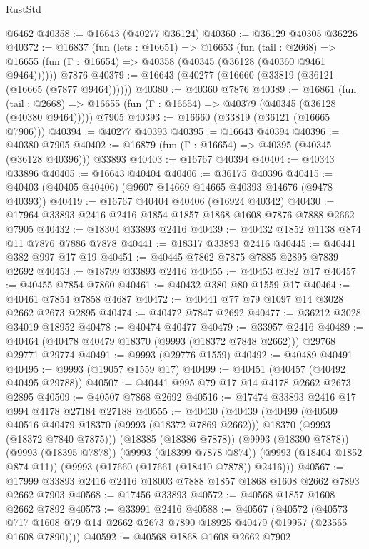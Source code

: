 \begin{lexlean}{RustStd}
\begin{coremodule}
    @6462
@40358 := @16643 (@40277 @36124)
@40360 := @36129 @40305 @36226
@40372 := @16837
    (fun (lets : @16651) =>
    @16653
      (fun (tail : @2668) =>
      @16655 (fun (Γ : @16654) => @40358 (@40345 (@36128 (@40360 @9461 @9464))))))
    @7876
@40379 := @16643 (@40277 (@16660 (@33819 (@36121 (@16665 (@7877 @9464))))))
@40380 := @40360 @7876
@40389 := @16861
    (fun (tail : @2668) => @16655 (fun (Γ : @16654) => @40379 (@40345 (@36128 (@40380 @9464)))))
    @7905
@40393 := @16660 (@33819 (@36121 (@16665 @7906)))
@40394 := @40277 @40393
@40395 := @16643 @40394
@40396 := @40380 @7905
@40402 := @16879 (fun (Γ : @16654) => @40395 (@40345 (@36128 @40396))) @33893
@40403 := @16767 @40394
@40404 := @40343 @33896
@40405 := @16643 @40404
@40406 := @36175 @40396
@40415 := @40403 (@40405 @40406) (@9607 @14669 @14665 @40393 @14676 (@9478 @40393))
@40419 := @16767 @40404 @40406 (@16924 @40342)
@40430 := @17964 @33893 @2416 @2416 @1854 @1857 @1868 @1608 @7876 @7888 @2662 @7905
@40432 := @18304 @33893 @2416
@40439 := @40432 @1852 @1138 @874 @11 @7876 @7886 @7878
@40441 := @18317 @33893 @2416
@40445 := @40441 @382 @997 @17 @19
@40451 := @40445 @7862 @7875 @7885 @2895 @7839 @2692
@40453 := @18799 @33893 @2416
@40455 := @40453 @382 @17
@40457 := @40455 @7854 @7860
@40461 := @40432 @380 @80 @1559 @17
@40464 := @40461 @7854 @7858 @4687
@40472 := @40441 @77 @79 @1097 @14 @3028 @2662 @2673 @2895
@40474 := @40472 @7847 @2692
@40477 := @36212 @3028 @34019 @18952
@40478 := @40474 @40477
@40479 := @33957 @2416
@40489 := @40464 (@40478 @40479 @18370 (@9993 (@18372 @7848 @2662))) @29768 @29771 @29774
@40491 := @9993 (@29776 @1559)
@40492 := @40489 @40491
@40495 := @9993 (@19057 @1559 @17)
@40499 := @40451 (@40457 (@40492 @40495 @29788))
@40507 := @40441 @995 @79 @17 @14 @4178 @2662 @2673 @2895
@40509 := @40507 @7868 @2692
@40516 := @17474 @33893 @2416 @17 @994 @4178 @27184 @27188
@40555 := @40430
    (@40439
      (@40499
        (@40509 @40516 @40479 @18370 (@9993 (@18372 @7869 @2662)))
        @18370
        (@9993 (@18372 @7840 @7875)))
      (@18385 (@18386 @7878))
      (@9993 (@18390 @7878))
      (@9993 (@18395 @7878))
      (@9993 (@18399 @7878 @874))
      (@9993 (@18404 @1852 @874 @11))
      (@9993 (@17660 (@17661 (@18410 @7878)) @2416)))
@40567 := @17999 @33893 @2416 @2416 @18003 @7888 @1857 @1868 @1608 @2662 @7893 @2662 @7903
@40568 := @17456 @33893
@40572 := @40568 @1857 @1608 @2662 @7892
@40573 := @33991 @2416
@40588 := @40567
    (@40572
      (@40573 @717 @1608 @79 @14 @2662 @2673 @7890 @18925 @40479 (@19957 (@23565 @1608 @7890))))
@40592 := @40568 @1868 @1608 @2662 @7902

\end{coremodule}
\end{lexlean}
